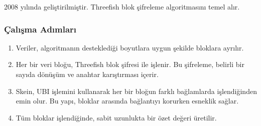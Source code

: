 2008 yılında geliştirilmiştir. Threefish blok şifreleme algoritmasını temel alır.

\subsubsection{Çalışma Adımları}

\begin{enumerate}
    \item Veriler, algoritmanın desteklediği boyutlara uygun şekilde bloklara ayrılır.
    \item Her bir veri bloğu, Threefish blok şifresi ile işlenir. Bu şifreleme, belirli bir sayıda dönüşüm ve anahtar karıştırması içerir.
    \item Skein, UBI işlemini kullanarak her bir bloğun farklı bağlamlarda işlendiğinden emin olur. Bu yapı, bloklar arasında bağlantıyı korurken esneklik sağlar.
    \item Tüm bloklar işlendiğinde, sabit uzunlukta bir özet değeri üretilir.
\end{enumerate}

\newpage